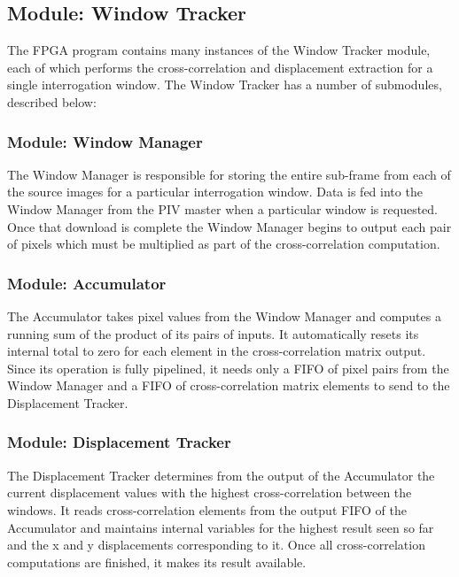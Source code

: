 \documentclass{article}
\begin{document}
	\subsection{Module: Window Tracker}
	The FPGA program contains many instances of the Window Tracker module, each of which performs the cross-correlation and displacement extraction for a single interrogation window. The Window Tracker has a number of submodules, described below:

	\subsubsection{Module: Window Manager}
	The Window Manager is responsible for storing the entire sub-frame from each of the source images for a particular interrogation window. Data is fed into the Window Manager from the PIV master when a particular window is requested. Once that download is complete the Window Manager begins to output each pair of pixels which must be multiplied as part of the cross-correlation computation. 

	\subsubsection{Module: Accumulator}
	The Accumulator takes pixel values from the Window Manager and computes a running sum of the product of its pairs of inputs. It automatically resets its internal total to zero for each element in the cross-correlation matrix output. Since its operation is fully pipelined, it needs only a FIFO of pixel pairs from the Window Manager and a FIFO of cross-correlation matrix elements to send to the Displacement Tracker. 

	\subsubsection{Module: Displacement Tracker}
	The Displacement Tracker determines from the output of the Accumulator the current displacement values with the highest cross-correlation between the windows. It reads cross-correlation elements from the output FIFO of the Accumulator and maintains internal variables for the highest result seen so far and the x and y displacements corresponding to it. Once all cross-correlation computations are finished, it makes its result available. 
\end{document}
